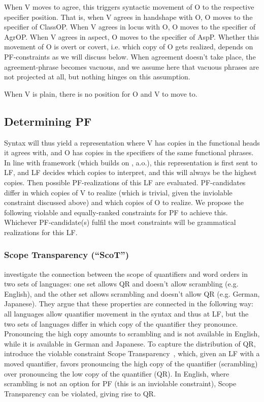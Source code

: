 \documentclass[output=paper]{langscibook}
\begin{document}
\noindent 
When V moves to agree, this triggers syntactic movement of O to the
respective specifier position. That is, when V agrees in handshape
with O, O moves to the specifier of ClassOP. When V agrees in
locus with O, O moves to the specifier of AgrOP. When V agrees in
aspect, O moves to the specifier of AspP. Whether this movement of O
is overt or covert, i.e. which copy of O gets realized, depends on
PF-constraints as we will discuss below. When agreement doesn’t take
place, the agreement-phrase becomes vacuous, and we assume here
that vacuous phrases are not projected at all, but nothing hinges on this
assumption.

When V is plain, there is no position for O and V to move to.

\subsection{Determining PF} 
\label{lasz:sec:23}

Syntax will thus yield a representation where V has copies in the
functional heads it agrees with, and O has copies in the specifiers of
the same functional phrases. In line with  
framework (which builds on \citealp{Bobaljik.1995,Bobaljik.2002,Brody.1995,ErteschikShir.1997}, a.o.), 
this representation is first sent to LF, and
LF decides which copies to interpret, and this will always be the
highest copies. Then possible PF-realizations of this LF are evaluated.
PF-candidates differ in which copies of V to realize (which is trivial,
given the inviolable constraint discussed above) and which copies of
O to realize. We propose the following violable and equally-ranked
constraints for PF to achieve this. Whichever PF-candidate(s) fulfil the most constraints will
be grammatical realizations for this LF.

\subsubsection{Scope Transparency (``ScoT'')}

\citet{Bobaljik.Wurmbrand.2012} investigate the connection between the
scope of quantifiers and word orders in two sets of languages: one set
allows QR and doesn’t allow scrambling (e.g. English), and the other
set allows scrambling and doesn’t allow QR (e.g. German, Japanese).
They argue that these properties are connected in the following way:
all languages allow quantifier movement in the syntax and thus at LF,
but the two sets of languages differ in which copy of the quantifier
they pronounce. Pronouncing the high copy amounts to scrambling
and is not available in English, while it is available in German and
Japanese. To capture the distribution of QR, \citeauthor{Bobaljik.Wurmbrand.2012} introduce the
violable constraint Scope Transparency~, which, given an LF with
a moved quantifier, favors pronouncing the high copy of the quantifier
(scrambling) over pronouncing the low copy of the quantifier (QR). In
English, where scrambling is not an option for PF (this is an inviolable
constraint), Scope Transparency can be violated, giving rise to QR.
\end{document}
